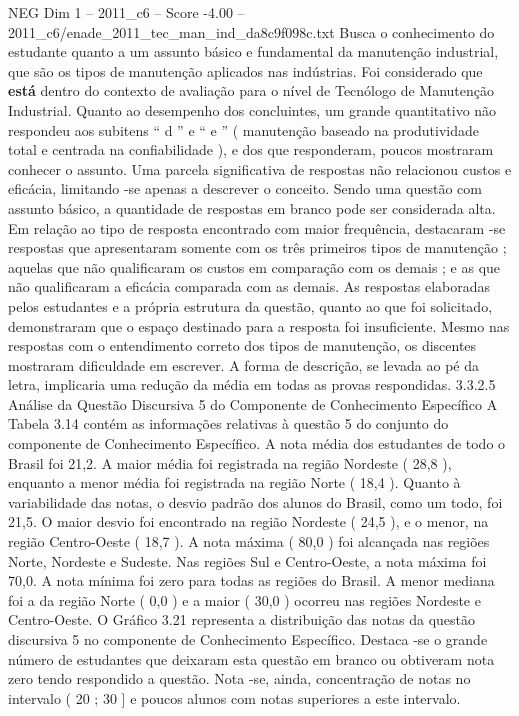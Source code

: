 \begin{textsample}{NEG Dim 1 – 2011\_c6 – Score -4.00 – 2011\_c6/enade\_2011\_tec\_man\_ind\_da8c9f098c.txt}
Busca o conhecimento do estudante quanto a um assunto básico e fundamental da manutenção industrial, que são os tipos de manutenção aplicados nas indústrias.
Foi considerado que \textbf{está} dentro do contexto de avaliação para o nível de Tecnólogo de Manutenção Industrial.
Quanto ao desempenho dos concluintes, um grande quantitativo não respondeu aos subitens “ d ” e “ e ” ( manutenção baseado na produtividade total e centrada na confiabilidade ), e dos que responderam, poucos mostraram conhecer o assunto.
Uma parcela significativa de respostas não relacionou custos e eficácia, limitando -se apenas a descrever o conceito.
Sendo uma questão com assunto básico, a quantidade de respostas em branco pode ser considerada alta.
Em relação ao tipo de resposta encontrado com maior frequência, destacaram -se respostas que apresentaram somente com os três primeiros tipos de manutenção ; aquelas que não qualificaram os custos em comparação com os demais ; e as que não qualificaram a eficácia comparada com as demais.
As respostas elaboradas pelos estudantes e a própria estrutura da questão, quanto ao que foi solicitado, demonstraram que o espaço destinado para a resposta foi insuficiente.
Mesmo nas respostas com o entendimento correto dos tipos de manutenção, os discentes mostraram dificuldade em escrever.
A forma de descrição, se levada ao pé da letra, implicaria uma redução da média em todas as provas respondidas. 3.3.2.5 Análise da Questão Discursiva 5 do Componente de Conhecimento Específico A Tabela 3.14 contém as informações relativas à questão 5 do conjunto do componente de Conhecimento Específico.
A nota média dos estudantes de todo o Brasil foi 21,2.
A maior média foi registrada na região Nordeste ( 28,8 ), enquanto a menor média foi registrada na região Norte ( 18,4 ).
Quanto à variabilidade das notas, o desvio padrão dos alunos do Brasil, como um todo, foi 21,5.
O maior desvio foi encontrado na região Nordeste ( 24,5 ), e o menor, na região Centro-Oeste ( 18,7 ).
A nota máxima ( 80,0 ) foi alcançada nas regiões Norte, Nordeste e Sudeste.
Nas regiões Sul e Centro-Oeste, a nota máxima foi 70,0.
A nota mínima foi zero para todas as regiões do Brasil.
A menor mediana foi a da região Norte ( 0,0 ) e a maior ( 30,0 ) ocorreu nas regiões Nordeste e Centro-Oeste.
O Gráfico 3.21 representa a distribuição das notas da questão discursiva 5 no componente de Conhecimento Específico.
Destaca -se o grande número de estudantes que deixaram esta questão em branco ou obtiveram nota zero tendo respondido a questão.
Nota -se, ainda, concentração de notas no intervalo ( 20 ; 30 ] e poucos alunos com notas superiores a este intervalo.

\end{textsample}

